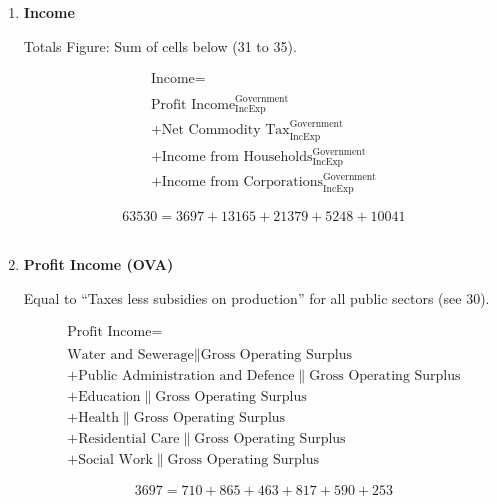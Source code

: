 \begin{enumerate}
\item \textbf {Income}

Totals Figure: Sum of cells below (31 to 35).

\begin{equation}
\begin{split}
\text{Income} =  \\ \\
\text{Profit Income}^\text{Government}_\text{IncExp}\\
+\text{Net Commodity Tax}^\text{Government}_\text{IncExp}\\
+\text{Income from Households}^\text{Government}_\text{IncExp}\\
+\text{Income from Corporations}^\text{Government}_\text{IncExp}
\end{split} \label{eq:2.5.34}
\end{equation}

\begin{equation} \nonumber
63530 = 3697+13165+21379+5248+10041
\end{equation}\\


\item \textbf {Profit Income (OVA)}

Equal to ``Taxes less subsidies on production'' for all public sectors (see 30).  \cite{ScotGov2013a}

\begin{equation}
\begin{split}
\text{Profit Income} =  \\ \\
\text{Water and Sewerage}\|\text{Gross Operating Surplus}\\
+\text{Public Administration and Defence}\|\text{Gross Operating Surplus}\\
+\text{Education}\|\text{Gross Operating Surplus}\\
+\text{Health}\|\text{Gross Operating Surplus}\\
+\text{Residential Care}\|\text{Gross Operating Surplus}\\
+\text{Social Work}\|\text{Gross Operating Surplus}
\end{split} \label{eq:2.5.35}
\end{equation}

\begin{equation} \nonumber
3697 = 710+865+463+817+590+253
\end{equation}\\



\end{enumerate}
